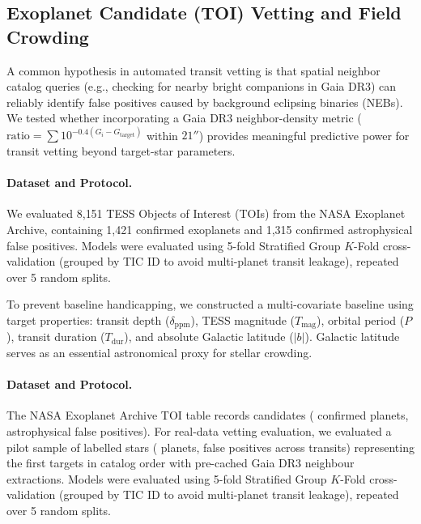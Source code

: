 \documentclass[12pt]{elsarticle}
\begin{document}
\subsection{Exoplanet Candidate (TOI) Vetting and Field Crowding}
\label{sec:toi_vetting}

A common hypothesis in automated transit vetting is that spatial neighbor catalog queries (e.g., checking for nearby bright companions in Gaia DR3) can reliably identify false positives caused by background eclipsing binaries (NEBs). We tested whether incorporating a Gaia DR3 neighbor-density metric ($\text{ratio} = \sum 10^{-0.4(G_i - G_{\mathrm{target}})}$ within $21''$) provides meaningful predictive power for transit vetting beyond target-star parameters.

\paragraph{Dataset and Protocol.}
We evaluated 8{,}151 TESS Objects of Interest (TOIs) from the NASA Exoplanet Archive, containing 1{,}421 confirmed exoplanets and 1{,}315 confirmed astrophysical false positives. Models were evaluated using 5-fold Stratified Group $K$-Fold cross-validation (grouped by TIC ID to avoid multi-planet transit leakage), repeated over 5 random splits.

To prevent baseline handicapping, we constructed a multi-covariate baseline using target properties: transit depth ($\delta_{\mathrm{ppm}}$), TESS magnitude ($T_{\mathrm{mag}}$), orbital period ($P$), transit duration ($T_{\mathrm{dur}}$), and absolute Galactic latitude ($|b|$). Galactic latitude serves as an essential astronomical proxy for stellar crowding.

\paragraph{Dataset and Protocol.}
The NASA Exoplanet Archive TOI table records \nTOICatalog{} candidates (\nTOICatalogPlanets{} confirmed planets, \nTOICatalogFP{} astrophysical false positives). For real-data vetting evaluation, we evaluated a pilot sample of \toiNStars{} labelled stars (\toiNPlanets{} planets, \toiNFP{} false positives across \toiNTransits{} transits) representing the first \toiNStars{} targets in catalog order with pre-cached Gaia DR3 neighbour extractions. Models were evaluated using 5-fold Stratified Group $K$-Fold cross-validation (grouped by TIC ID to avoid multi-planet transit leakage), repeated over 5 random splits.
\end{document}
